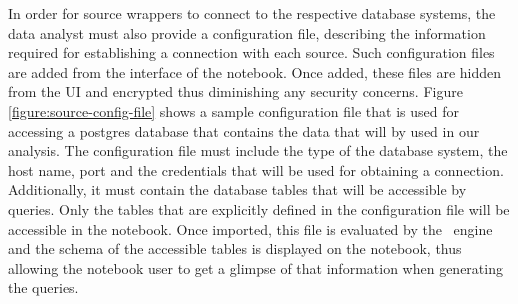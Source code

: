  In order for source wrappers to connect to the respective database systems, the data analyst must also provide a configuration file, describing the information required for establishing a connection with each source. Such configuration files are added from the interface of the notebook. Once added, these files are hidden from the UI and encrypted thus diminishing any security concerns. Figure \ref{figure:source-config-file} shows a sample configuration file that is used for accessing a postgres database that contains the data that will by used in our analysis. The configuration file must include the type of the database system, the host name, port and the credentials that will be used for obtaining a connection. Additionally, it must contain the database tables that will be accessible by queries. Only the tables that are explicitly defined in the configuration file will be accessible in the notebook. Once imported, this file is evaluated by the \projname\ engine and the schema of the accessible tables is displayed on the notebook, thus allowing the notebook user to get a glimpse of that information when generating the queries. 



